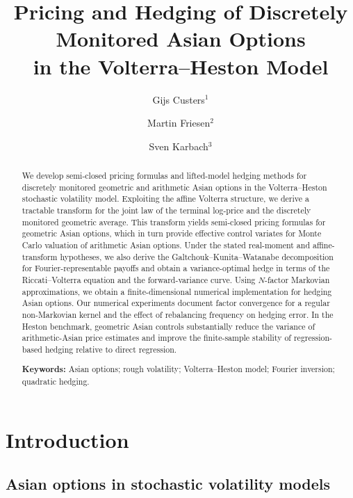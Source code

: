 \documentclass[10pt,a4paper,reqno]{amsart}
\title[Asian Options in the Volterra--Heston Model]{Pricing and Hedging of Discretely Monitored Asian Options\\in the Volterra--Heston Model}
\author[G. Custers]{Gijs Custers$^{1}$}
\author[M. Friesen]{Martin Friesen$^{2}$}
\author[S. Karbach]{Sven Karbach$^{3}$}
\theoremstyle{plain}
\theoremstyle{definition}
\theoremstyle{remark}
\theoremstyle{example}
\begin{document}
\begin{abstract}
We develop semi-closed pricing formulas and lifted-model hedging methods for
discretely monitored geometric and arithmetic Asian options in the Volterra--Heston stochastic volatility model. Exploiting the affine Volterra structure, we derive a tractable transform for the joint law of the terminal log-price and the discretely monitored geometric average. This transform yields semi-closed pricing formulas for geometric Asian options, which in turn provide effective control variates for Monte Carlo valuation of arithmetic Asian options. Under the stated real-moment and affine-transform hypotheses, we also derive the Galtchouk--Kunita--Watanabe decomposition for Fourier-representable payoffs and obtain a variance-optimal hedge in terms of the Riccati--Volterra equation and the forward-variance curve. Using $N$-factor Markovian approximations, we obtain a finite-dimensional numerical implementation for hedging Asian options. Our numerical experiments document factor convergence for a regular non-Markovian kernel and the effect of rebalancing frequency on hedging error. In the Heston benchmark, geometric Asian controls substantially reduce the variance of arithmetic-Asian price estimates and improve the finite-sample stability of regression-based hedging relative to direct regression.
\medskip

\noindent\textbf{Keywords:} Asian options; rough volatility; Volterra--Heston model; Fourier inversion; quadratic hedging.
\end{abstract}

\maketitle

\vspace{-4mm}

\section{Introduction}

\subsection{Asian options in stochastic volatility models}
\end{document}
